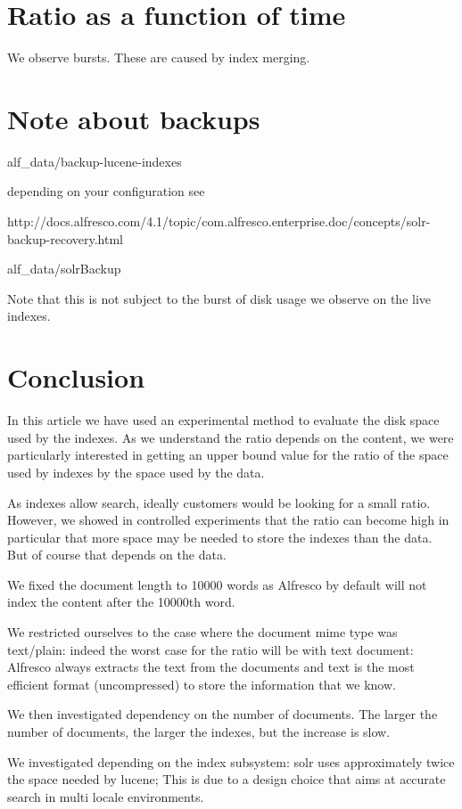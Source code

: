 \documentclass[12pt,a4]{article}
\begin{document}
\section{Ratio as a function of time}
We observe bursts.
These are caused by index merging.

\section{Note about backups}
alf\_data/backup-lucene-indexes

depending on your configuration see 

http://docs.alfresco.com/4.1/topic/com.alfresco.enterprise.doc/concepts/solr-backup-recovery.html

alf\_data/solrBackup

Note that this is not subject to the burst of disk usage we observe on the live indexes.


\section{Conclusion}

In this article we have used an experimental method to evaluate the disk space used by the indexes. As we understand the ratio depends on the content, we were particularly interested in getting an upper bound value for the ratio of the space used by indexes by the space used by the data.

As indexes allow search, ideally customers would be looking for a small ratio. However, we showed in controlled experiments that the ratio can become high in particular that more space may be needed to store the indexes than the data. But of course that depends on the data.

We fixed the document length to 10000 words as Alfresco by default will not index the content after the 10000th word.

We restricted ourselves to the case where the document mime type was text/plain: indeed the worst case for the ratio will be with text document: Alfresco always extracts the text from the documents and text is the most efficient format (uncompressed) to store the information that we know.

We then investigated dependency on the number of documents. The larger the number of documents, the larger the indexes, but the increase is slow.

We investigated depending on the index subsystem: solr uses approximately twice the space needed by lucene; This is due to a design choice that aims at accurate search in multi locale environments.
\end{document}
